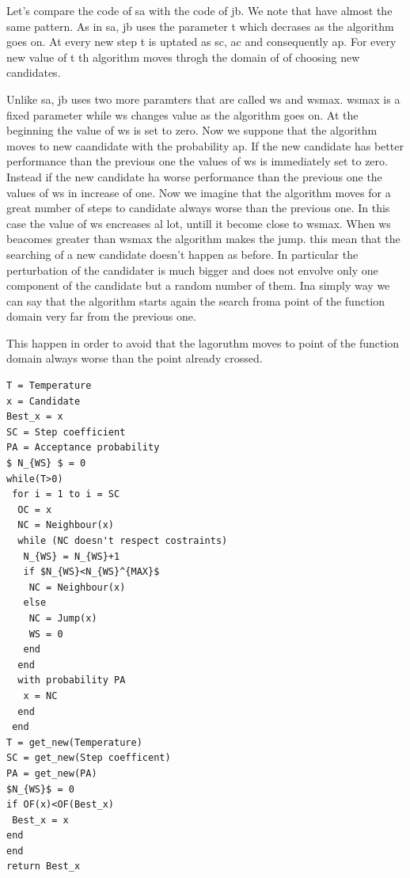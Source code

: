 \documentclass[journal]{IEEEtran}
\begin{document}
Let's compare the code of \gls{sa} with the code of \gls{jb}. We note that have almost the same pattern. As in \gls{sa}, \gls{jb} uses the parameter \gls{t} which decrases as the algorithm goes on. At every new step \gls{t} is uptated as \gls{sc}, \gls{ac} and consequently \gls{ap}. For every new value of \gls{t} th algorithm moves throgh the domain of \gls{of} choosing new candidates.

Unlike \gls{sa}, \gls{jb} uses two more paramters that are called \gls{ws} and \gls{wsmax}. \gls{wsmax} is a fixed parameter while \gls{ws} changes value as the algorithm goes on. At the beginning the value of \gls{ws} is set to zero. Now we suppone that the algorithm moves to new caandidate with the probability \gls{ap}. If the new candidate has better performance than the previous one the values of \gls{ws} is immediately set to zero. Instead if the new candidate ha worse performance than the previous one the values of \gls{ws} in increase of one. Now we imagine that the algorithm moves for a great number of steps to candidate always worse than the previous one. In this case the value of \gls{ws} encreases al lot, untill it become close to \gls{wsmax}. When \gls{ws} beacomes greater than \gls{wsmax} the algorithm makes the jump. this mean that the searching of a new candidate doesn't happen as before. In particular the perturbation of the candidater is much bigger and does not envolve only one component of the candidate but a random number of them. Ina simply way we can say that the algorithm starts again the search froma point of the function domain very far from the previous one.

This happen in order to avoid that the lagoruthm moves to point of the function domain always worse than the point already crossed. 

\pagebreak

\begin{lstlisting}[mathescape=true,frame=single]
T = Temperature
x = Candidate
Best_x = x
SC = Step coefficient
PA = Acceptance probability
$ N_{WS} $ = 0
while(T>0)
 for i = 1 to i = SC
  OC = x
  NC = Neighbour(x)
  while (NC doesn't respect costraints)
   N_{WS} = N_{WS}+1
   if $N_{WS}<N_{WS}^{MAX}$
    NC = Neighbour(x)
   else
    NC = Jump(x)
    WS = 0
   end
  end
  with probability PA
   x = NC
  end
 end
T = get_new(Temperature)
SC = get_new(Step coefficent)
PA = get_new(PA)
$N_{WS}$ = 0
if OF(x)<OF(Best_x)
 Best_x = x
end
end
return Best_x
\end{lstlisting} 
\end{document}
